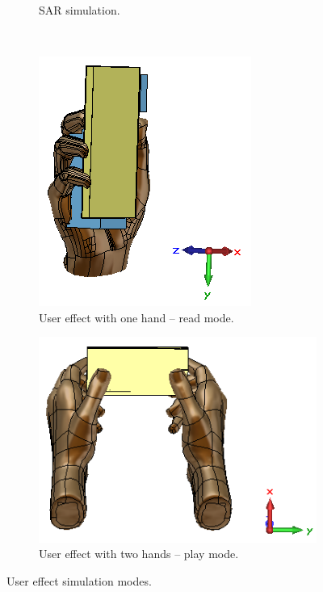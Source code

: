 \begin{figure}[htbp]
\begin{subfigure}[b]{0.49\linewidth}
        \caption{SAR simulation.}
        \label{fig:usereff_sar}
      \end{subfigure}
      ~
      \begin{subfigure}[b]{0.49\linewidth}
        \centering
        \includegraphics{img/tech_sol/usereff_intro/usereff_onehand}
        \caption{User effect with one hand -- read mode.}
        \label{fig:usereff_onehand}
      \end{subfigure}
      \hfill
      \begin{subfigure}[b]{0.49\linewidth}
        \centering
        \includegraphics{img/tech_sol/usereff_intro/usereff_twohand}
        \caption{User effect with two hands -- play mode.}
        \label{fig:usereff_twohand}
      \end{subfigure}
      \caption{User effect simulation modes.}
    \label{fig:usereff_intro}
\end{figure}
